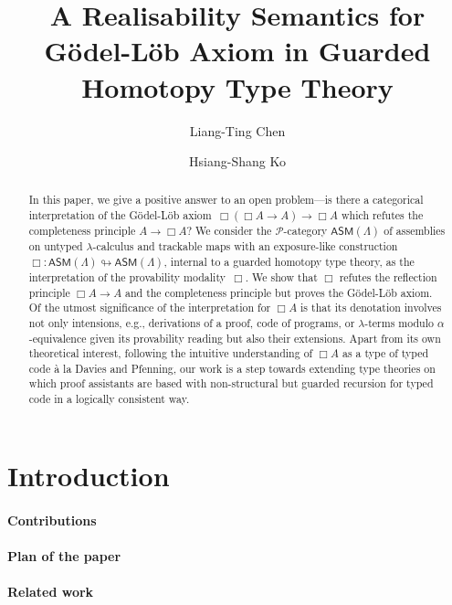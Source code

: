 \documentclass[a4paper,UKenglish,numberwithinsect,cleveref,thm-restate]{lipics-v2021}
\title{A Realisability Semantics for Gödel-Löb Axiom in Guarded Homotopy Type Theory}
\author{Liang-Ting Chen}%
  {Institute of Information Science, Academia Sinica, Taiwan~\url{https://l-tchen.github.io}}%
  {liang.ting.chen.tw@gmail.com}%
  {https://orcid.org/0000-0002-3250-1331}{}
\author{Hsiang-Shang Ko}%
  {Institute of Information Science, Academia Sinica, Taiwan~\url{https://josh-hs-ko.github.io}}%
  {joshko@iis.sinica.edu.tw}%
  {https://orcid.org/0000-0002-2439-1048}{}
\newcommand{\PP}{\mathscr{P}}
\newcommand{\ASM}{\mathsf{ASM}}
\theoremstyle{plain}
\begin{document}
\maketitle

\begin{abstract}
  In this paper, we give a positive answer to an open problem---is there a categorical interpretation of the Gödel-Löb axiom~$\Box (\Box A \to A) \to \Box A$ which refutes the completeness principle $A \to \Box A$?
  We consider the $\PP$-category $\ASM(\Lambda)$ of assemblies on untyped $\lambda$-calculus and trackable maps with an exposure-like construction $\Box\colon \ASM(\Lambda) \looparrowright \ASM(\Lambda)$, internal to a guarded homotopy type theory, as the interpretation of the provability modality~$\Box$.
  We show that $\Box$ refutes the reflection principle $\Box A \to A$ and the completeness principle but proves the Gödel-Löb axiom.
  Of the utmost significance of the interpretation for $\Box A$ is that its denotation involves not only intensions, e.g., derivations of a proof, code of programs, or $\lambda$-terms modulo $\alpha$-equivalence given its provability reading but also their extensions. 
  Apart from its own theoretical interest, following the intuitive understanding of $\Box A$ as a type of typed code \`a la Davies and Pfenning, our work is a step towards extending type theories on which proof assistants are based with non-structural but guarded recursion for typed code in a logically consistent way.
\end{abstract}

\section{Introduction}\label{sec:intro}
\cite{Litak2014}
\cite{Davies2001b}

\paragraph*{Contributions}

\paragraph*{Plan of the paper}

\paragraph*{Related work}
\cite{Visser2019,Beklemishev2006}
\cite{Kavvos2017,Kavvos2020}
\cite{Shamkanov2014,Shamkanov2016a}
\end{document}
